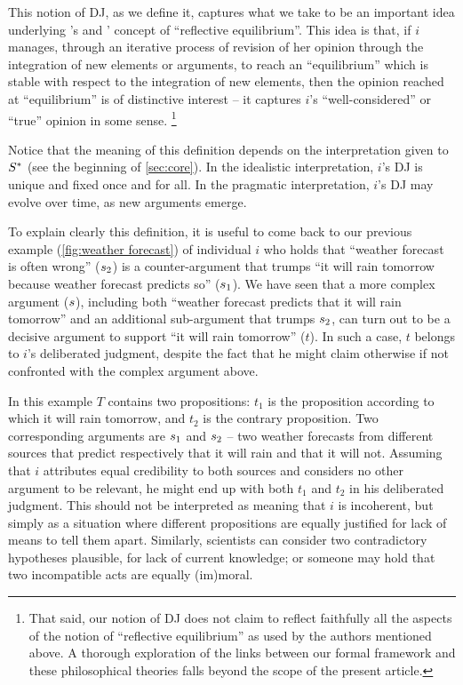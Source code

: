 \documentclass[smallextended,nospthms, natbib]{svjour3}
\begin{document}
This notion of \ac{DJ}, as we define it, captures what we take to be an important idea underlying \citeauthor{goodman_fact_1983}’s \citeyearpar{goodman_fact_1983} and \citeauthor{rawls_theory_1999}’ \citeyearpar{rawls_theory_1999} concept of “reflective equilibrium”. This idea is that, if $i$ manages, through an iterative process of revision of her opinion through the integration of new elements or arguments, to reach an “equilibrium” which is stable with respect to the integration of new elements, then the opinion reached at “equilibrium” is of distinctive interest -- it captures $i$'s “well-considered” or “true” opinion in some sense.%
\footnote{That said, our notion of \ac{DJ} does not claim to reflect faithfully all the aspects of the notion of “reflective equilibrium” as used by the authors mentioned above. A thorough exploration of the links between our formal framework and these philosophical theories falls beyond the scope of the present article.}

Notice that the meaning of this definition depends on the interpretation given to $S^*$ (see the beginning of \cref{sec:core}).
 In the idealistic interpretation, $i$'s \ac{DJ} is unique and fixed once and for all. In the pragmatic interpretation, $i$'s \ac{DJ} may evolve over time, as new arguments emerge.

\begin{example}
\label{ex:weather forecast2}
To explain clearly this definition, it is useful to come back to our previous example (\cref{fig:weather forecast}) of individual $i$ who holds that “weather forecast is often wrong” ($s_2$) is a counter-argument that trumps “it will rain tomorrow because weather forecast predicts so” ($s_1$). We have seen that a more complex argument ($s$), including both “weather forecast predicts that it will rain tomorrow” and an additional sub-argument that trumps $s_2$, can turn out to be a decisive argument to support “it will rain tomorrow” ($t$). In such a case, $t$ belongs to $i$'s deliberated judgment, despite the fact that he might claim otherwise if not confronted with the complex argument above.
\end{example}

\begin{example}
\label{ex:weather forecast contr}
	In this example $T$ contains two propositions: $t_1$ is the proposition according to which it will rain tomorrow, and $t_2$ is the contrary proposition. Two corresponding arguments are $s_1$ and $s_2$ -- two weather forecasts from different sources that predict respectively that it will rain and that it will not. Assuming that $i$ attributes equal credibility to both sources and considers no other argument to be relevant, he might end up with both $t_1$ and $t_2$ in his deliberated judgment. This should not be interpreted as meaning that $i$ is incoherent, but simply as a situation where different propositions are equally justified for lack of means to tell them apart. Similarly, scientists can consider two contradictory hypotheses plausible, for lack of current knowledge; or someone may hold that two incompatible acts are equally (im)moral.
\end{example}
\end{document}

